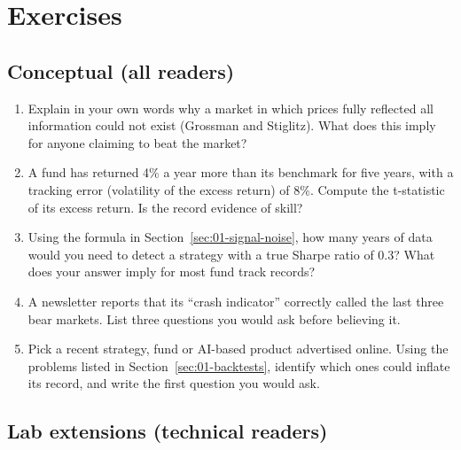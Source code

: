 \section*{Exercises}

\subsection*{Conceptual (all readers)}

\begin{enumerate}
  \item Explain in your own words why a market in which prices fully reflected all information could not exist (Grossman and Stiglitz). What does this imply for anyone claiming to beat the market?
  \item A fund has returned 4\% a year more than its benchmark for five years, with a tracking error (volatility of the excess return) of 8\%. Compute the t-statistic of its excess return. Is the record evidence of skill?
  \item Using the formula in Section~\ref{sec:01-signal-noise}, how many years of data would you need to detect a strategy with a true Sharpe ratio of 0.3? What does your answer imply for most fund track records?
  \item A newsletter reports that its ``crash indicator'' correctly called the last three bear markets. List three questions you would ask before believing it.
  \item Pick a recent strategy, fund or AI-based product advertised online. Using the problems listed in Section~\ref{sec:01-backtests}, identify which ones could inflate its record, and write the first question you would ask.
\end{enumerate}

\subsection*{Lab extensions (technical readers)}


